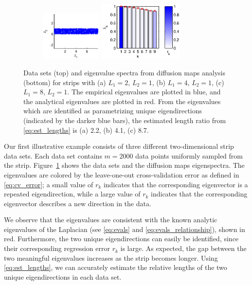 \begin{figure}[!t]
%
%
\begin{subfigure}{0.3\textwidth}
\includegraphics[height=2.5cm]{strip_data_L8}
\includegraphics[height=3cm]{strip_spectrum_L8}
\caption{}
\end{subfigure}
%
\caption{Data sets (top) and eigenvalue spectra from diffusion maps analysis (bottom) for strips with (a) $L_1 = 2$, $L_2 = 1$, (b) $L_1 = 4$, $L_2 = 1$, (c) $L_1 = 8$, $L_2 = 1$. The empirical eigenvalues are plotted in blue, and the analytical eigenvalues are plotted in red. From the eigenvalues which are identified as parametrizing unique eigendirections (indicated by the darker blue bars), the estimated length ratio from \eqref{eq:est_lengths} is (a) 2.2, (b) 4.1, (c) 8.7.}
\label{fig:strip_compare_analytic}
\end{figure}

Our first illustrative example consists of three different two-dimensional strip data sets.
%
Each data set contains $m=2000$ data points uniformly sampled from the strip.
%
Figure~\ref{fig:strip_compare_analytic} shows the data sets and the diffusion maps eigenspectra.
%
The eigenvalues are colored by the leave-one-out cross-validation error as defined in \eqref{eq:cv_error}; a small value of $r_k$ indicates that the corresponding eigenvector is a repeated eigendirection, while a large value of $r_k$ indicates that the corresponding eigenvector describes a new direction in the data.
%

We observe that the eigenvalues are consistent with the known analytic eigenvalues of the Laplacian (see \eqref{eq:evals} and \eqref{eq:evals_relationship}), shown in red.
%
Furthermore, the two unique eigendirections can easily be identified, since their corresponding regression error $r_k$ is large.
%
As expected, the gap between the two meaningful eigenvalues increases as the strip becomes longer.
%
Using \eqref{eq:est_lengths}, we can accurately estimate the relative lengths of the two unique eigendirections in each data set.


